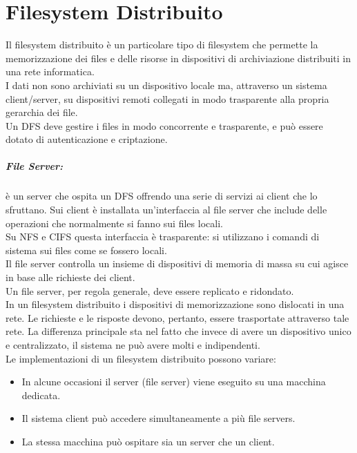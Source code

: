 \documentclass[a4paper]{report}
\begin{document}
\chapter{Filesystem Distribuito}
Il filesystem distribuito è un particolare tipo di filesystem che permette la memorizzazione dei files e delle risorse in dispositivi di archiviazione distribuiti in una rete informatica.\\I dati non sono archiviati su un dispositivo locale ma, attraverso un sistema client/server, su dispositivi remoti collegati in modo trasparente alla propria gerarchia dei file.\\Un DFS deve gestire i files in modo concorrente e trasparente, e può essere dotato di autenticazione e criptazione.\\
\paragraph{File Server:} è un server che ospita un DFS offrendo una serie di servizi ai client che lo sfruttano. Sui client è installata un'interfaccia al file server che include delle operazioni che normalmente si fanno sui files locali.\\
Su NFS e CIFS questa interfaccia è trasparente: si utilizzano i comandi di sistema sui files come se fossero locali.\\
Il file server controlla un insieme di dispositivi di memoria di massa su cui agisce in base alle richieste dei client.\\
Un file server, per regola generale, deve essere replicato e ridondato.\\
In un filesystem distribuito i dispositivi di memorizzazione sono dislocati in una rete. Le richieste e le risposte devono, pertanto, essere trasportate attraverso tale rete. La differenza principale sta nel fatto che invece di avere un dispositivo unico e centralizzato, il sistema ne può avere molti e indipendenti.\\
Le implementazioni di un filesystem distribuito possono variare:
\begin{itemize}
\item In alcune occasioni il server (file server) viene eseguito su una macchina dedicata.
\item Il sistema client può accedere simultaneamente a più file servers.
\item La stessa macchina può ospitare sia un server che un client.

\end{itemize}
\end{document}
